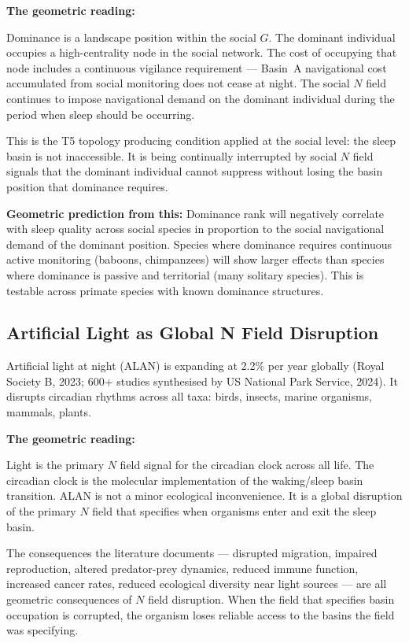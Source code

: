 \documentclass[10pt, a4paper]{article}
\begin{document}
\textbf{The geometric reading:}

Dominance is a landscape position within
the social $G$. The dominant individual
occupies a high-centrality node in
the social network. The cost of
occupying that node includes a
continuous vigilance requirement ---
Basin~A navigational cost accumulated
from social monitoring does not cease
at night. The social $N$ field continues
to impose navigational demand on
the dominant individual during the
period when sleep should be occurring.

This is the T5 topology producing
condition applied at the social level:
the sleep basin is not inaccessible.
It is being continually interrupted by
social $N$ field signals that the
dominant individual cannot suppress
without losing the basin position
that dominance requires.

\textbf{Geometric prediction from this:}
Dominance rank will negatively correlate
with sleep quality across social species
in proportion to the social navigational
demand of the dominant position.
Species where dominance requires
continuous active monitoring
(baboons, chimpanzees) will show
larger effects than species where
dominance is passive and territorial
(many solitary species). This is
testable across primate species with
known dominance structures.

\subsection{Artificial Light as Global
N Field Disruption}

Artificial light at night (ALAN) is
expanding at 2.2\% per year globally
(Royal Society B, 2023; 600+ studies
synthesised by US National Park
Service, 2024). It disrupts circadian
rhythms across all taxa: birds,
insects, marine organisms, mammals,
plants.

\textbf{The geometric reading:}

Light is the primary $N$ field signal
for the circadian clock across all
life. The circadian clock is the
molecular implementation of the
waking/sleep basin transition. ALAN
is not a minor ecological inconvenience.
It is a global disruption of the
primary $N$ field that specifies
when organisms enter and exit the
sleep basin.

The consequences the literature documents
--- disrupted migration, impaired
reproduction, altered predator-prey
dynamics, reduced immune function,
increased cancer rates, reduced
ecological diversity near light sources
--- are all geometric consequences of
$N$ field disruption. When the field
that specifies basin occupation is
corrupted, the organism loses reliable
access to the basins the field was
specifying.
\end{document}
